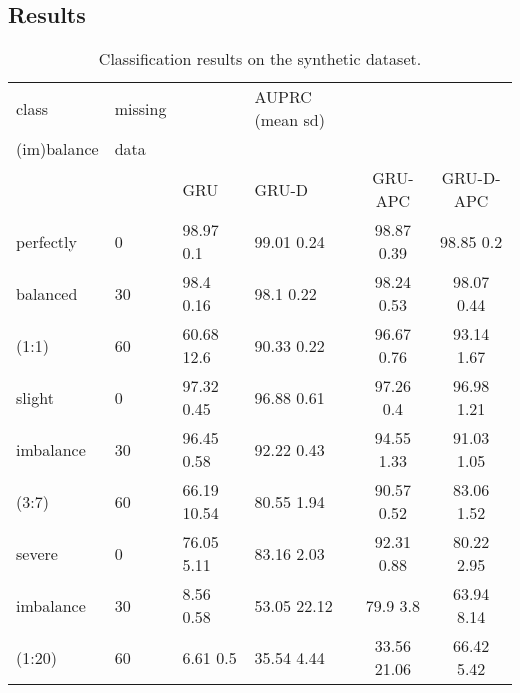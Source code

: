 \documentclass{article}
\begin{document}
\newpage
\subsection{\large Results}


\begin{table}[h]
\caption{
Classification results on the synthetic dataset.}
\label{tab:results_synthetic}
\vskip 0.1in
\begin{center}
\begin{small}
\begin{sc}
\begin{tabular}{llllcc}
\toprule
{class} & {missing} &  & AUPRC (mean  sd) &  &  \\
{(im)balance} & {data} &  &  &  &  \\
\hline
 & & GRU & GRU-D & GRU-APC & GRU-D-APC  \\
\midrule
{perfectly} & {0 } &  98.97  0.1 &  99.01  0.24 &  98.87  0.39 &  98.85  0.2\\ \cline{2-6}

{balanced} & {30 } &  98.4  0.16 & 98.1  0.22 & 98.24 
 0.53 &  98.07  0.44 \\ \cline{2-6}
{(1:1)} & {60 } &  60.68  12.6 & 90.33  0.22 &  
96.67  0.76 &  93.14  1.67  \\ 
\hline
{slight} & {0 } &  97.32  0.45 &  96.88  0.61 & 97.26  0.4 &  96.98  1.21 \\ \cline{2-6}
{imbalance} & {30 } &  96.45  0.58 & 92.22  0.43 &   94.55  1.33 &  91.03  1.05 \\ \cline{2-6}
{(3:7)} & {60 } &  66.19  10.54 &  80.55  1.94 &   90.57  0.52 &  83.06  1.52\\ 
\hline
{severe} & {0 } &  76.05  5.11 &  83.16  2.03 & 92.31  0.88 &  80.22  2.95 \\ \cline{2-6}
{imbalance} & {30 } &  8.56  0.58 &  53.05  22.12 &  79.9  3.8 &  63.94  8.14 \\ \cline{2-6}
{(1:20)} & {60 } &  6.61  0.5 &  35.54  4.44 & 33.56  21.06 &  66.42  5.42\\
\bottomrule
\end{tabular}
\end{sc}
\end{small}
\end{center}
\vskip -0.15in
\end{table}

\vspace{0.5cm}
\end{document}
